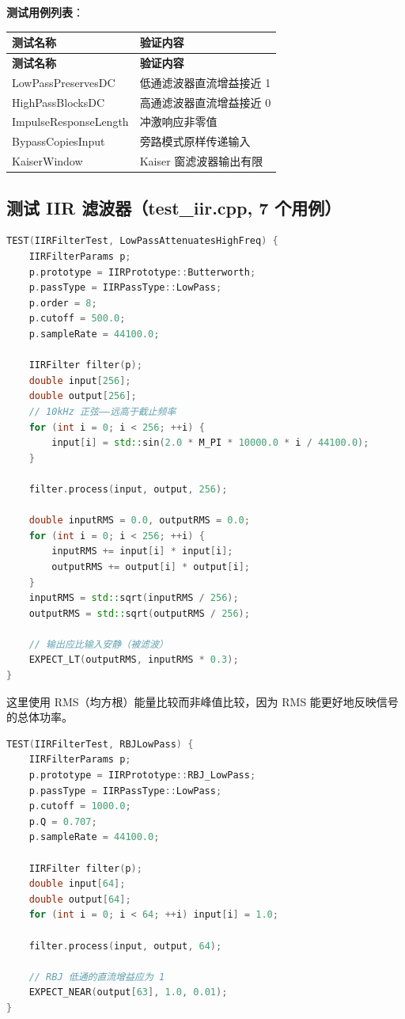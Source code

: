 ﻿\documentclass[12pt,a4paper,oneside]{ctexbook}
\begin{document}
\textbf{测试用例列表}：

\begin{longtable}{p{4cm}p{9cm}}
    \toprule
    \textbf{测试名称} & \textbf{验证内容} \\
    \midrule
    \endfirsthead
    \toprule
    \textbf{测试名称} & \textbf{验证内容} \\
    \midrule
    \endhead
    \bottomrule
    \endfoot
    LowPassPreservesDC & 低通滤波器直流增益接近 1 \\
    HighPassBlocksDC & 高通滤波器直流增益接近 0 \\
    ImpulseResponseLength & 冲激响应非零值 \\
    BypassCopiesInput & 旁路模式原样传递输入 \\
    KaiserWindow & Kaiser 窗滤波器输出有限 \\
    \bottomrule
\end{longtable}

\subsection{测试 IIR 滤波器（test\_iir.cpp, 7 个用例）}

\begin{lstlisting}[language=C++, caption={IIR 低通衰减高频测试}]
TEST(IIRFilterTest, LowPassAttenuatesHighFreq) {
    IIRFilterParams p;
    p.prototype = IIRPrototype::Butterworth;
    p.passType = IIRPassType::LowPass;
    p.order = 8;
    p.cutoff = 500.0;
    p.sampleRate = 44100.0;

    IIRFilter filter(p);
    double input[256];
    double output[256];
    // 10kHz 正弦——远高于截止频率
    for (int i = 0; i < 256; ++i) {
        input[i] = std::sin(2.0 * M_PI * 10000.0 * i / 44100.0);
    }

    filter.process(input, output, 256);

    double inputRMS = 0.0, outputRMS = 0.0;
    for (int i = 0; i < 256; ++i) {
        inputRMS += input[i] * input[i];
        outputRMS += output[i] * output[i];
    }
    inputRMS = std::sqrt(inputRMS / 256);
    outputRMS = std::sqrt(outputRMS / 256);

    // 输出应比输入安静（被滤波）
    EXPECT_LT(outputRMS, inputRMS * 0.3);
}
\end{lstlisting}

这里使用 RMS（均方根）能量比较而非峰值比较，因为 RMS 能更好地反映信号的总体功率。

\begin{lstlisting}[language=C++, caption={RBJ 低通直流增益测试}]
TEST(IIRFilterTest, RBJLowPass) {
    IIRFilterParams p;
    p.prototype = IIRPrototype::RBJ_LowPass;
    p.passType = IIRPassType::LowPass;
    p.cutoff = 1000.0;
    p.Q = 0.707;
    p.sampleRate = 44100.0;

    IIRFilter filter(p);
    double input[64];
    double output[64];
    for (int i = 0; i < 64; ++i) input[i] = 1.0;

    filter.process(input, output, 64);

    // RBJ 低通的直流增益应为 1
    EXPECT_NEAR(output[63], 1.0, 0.01);
}
\end{lstlisting}
\end{document}

